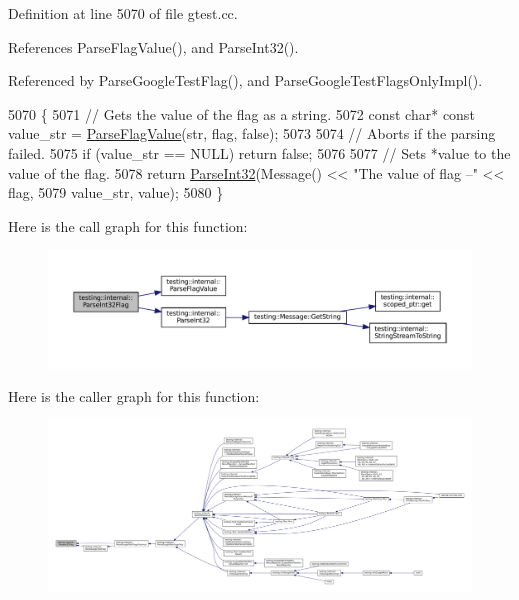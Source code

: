 Definition at line 5070 of file gtest.\+cc.



References Parse\+Flag\+Value(), and Parse\+Int32().



Referenced by Parse\+Google\+Test\+Flag(), and Parse\+Google\+Test\+Flags\+Only\+Impl().


\begin{DoxyCode}
5070                                                                      \{
5071   \textcolor{comment}{// Gets the value of the flag as a string.}
5072   \textcolor{keyword}{const} \textcolor{keywordtype}{char}* \textcolor{keyword}{const} value\_str = \hyperlink{namespacetesting_1_1internal_a8bfd56af5e4a89bfb76f7e1723e41b03}{ParseFlagValue}(str, flag, \textcolor{keyword}{false});
5073 
5074   \textcolor{comment}{// Aborts if the parsing failed.}
5075   \textcolor{keywordflow}{if} (value\_str == NULL) \textcolor{keywordflow}{return} \textcolor{keyword}{false};
5076 
5077   \textcolor{comment}{// Sets *value to the value of the flag.}
5078   \textcolor{keywordflow}{return} \hyperlink{namespacetesting_1_1internal_ac06fc81336a3d80755f4020d34321766}{ParseInt32}(Message() << \textcolor{stringliteral}{"The value of flag --"} << flag,
5079                     value\_str, value);
5080 \}
\end{DoxyCode}
Here is the call graph for this function\+:
\nopagebreak
\begin{figure}[H]
\begin{center}
\leavevmode
\includegraphics[width=350pt]{namespacetesting_1_1internal_ae3449e173767750b613114ceac6d916a_cgraph}
\end{center}
\end{figure}
Here is the caller graph for this function\+:
\nopagebreak
\begin{figure}[H]
\begin{center}
\leavevmode
\includegraphics[width=350pt]{namespacetesting_1_1internal_ae3449e173767750b613114ceac6d916a_icgraph}
\end{center}
\end{figure}
\mbox{\label{namespacetesting_1_1internal_aa4ce312efaaf7a97aac2303173afe021}} 
